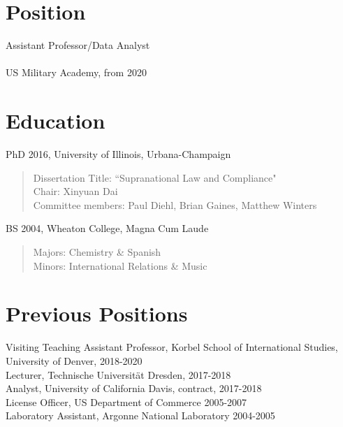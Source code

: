 \documentclass[margin, 10pt]{CVStyleTemplate}\usepackage[]{graphicx}\usepackage[]{color}
\begin{document}
\begin{resume}

\section{Position}

Assistant Professor/Data Analyst \\
\\
US Military Academy, from 2020 \\


\section{Education}
PhD 2016, University of Illinois, Urbana-Champaign
  \begin{quotation} \noindent
  Dissertation Title: ``Supranational Law and Compliance"\\
  Chair: Xinyuan Dai\\
  Committee members: Paul Diehl, Brian Gaines, Matthew Winters
  \end{quotation}
BS 2004, Wheaton College, Magna Cum Laude
  \begin{quotation} \noindent
  Majors: Chemistry \& Spanish \\
  Minors: International Relations \& Music
  \end{quotation}
%


\section{Previous Positions}

Visiting Teaching Assistant Professor, Korbel School of International Studies, University of Denver,  2018-2020 \\
Lecturer, Technische Universit\"{a}t Dresden, 2017-2018 \\
Analyst, University of California Davis, contract, 2017-2018 \\
License Officer, US Department of Commerce 2005-2007 \\
Laboratory Assistant, Argonne National Laboratory 2004-2005 \\


\end{resume}
\end{document}
